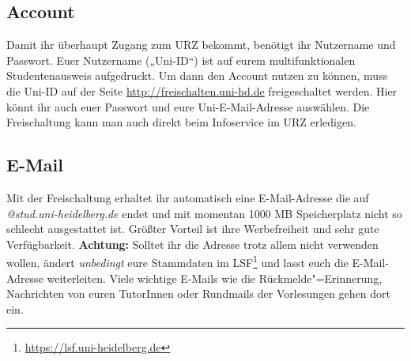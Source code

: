 \subsection*{Account}
Damit ihr überhaupt Zugang zum URZ bekommt, benötigt ihr Nutzername
und Passwort. Euer Nutzername („Uni-ID“) ist auf eurem multifunktionalen Studentenausweis aufgedruckt.
Um dann den Account nutzen zu können, muss die Uni-ID auf der Seite \url{http://freischalten.uni-hd.de} freigeschaltet werden. Hier könnt ihr auch euer Passwort und eure Uni-E-Mail-Adresse auswählen.
Die Freischaltung kann man auch direkt beim Infoservice im URZ erledigen.

\subsection*{E-Mail}
Mit der Freischaltung erhaltet ihr automatisch eine E-Mail-Adresse die auf \emph{@stud.uni-heidelberg.de} endet und mit momentan 1000 MB Speicherplatz nicht so schlecht ausgestattet ist. Größter Vorteil ist ihre Werbefreiheit und sehr gute Verfügbarkeit. \textbf{Achtung:} Solltet ihr die Adresse trotz allem nicht verwenden wollen, ändert \emph{unbedingt} eure Stammdaten im LSF\footnote{\url{https://lsf.uni-heidelberg.de}} und lasst euch die E-Mail-Adresse weiterleiten. Viele wichtige E-Mails wie die Rückmelde"=Erinnerung, Nachrichten von euren TutorInnen oder Rundmails der Vorlesungen gehen dort ein.

